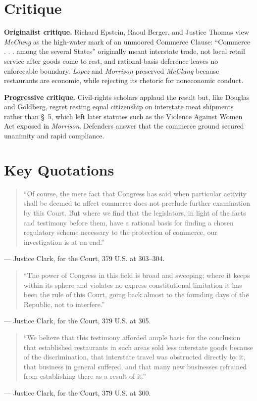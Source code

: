 \documentclass[12pt]{article}
\begin{document}
\section{Critique}

\textbf{Originalist critique.} Richard Epstein, Raoul Berger, and Justice Thomas view \textit{McClung} as the high-water mark of an unmoored Commerce Clause: ``Commerce . . . among the several States'' originally meant interstate trade, not local retail service after goods come to rest, and rational-basis deference leaves no enforceable boundary. \textit{Lopez} and \textit{Morrison} preserved \textit{McClung} because restaurants are economic, while rejecting its rhetoric for noneconomic conduct.

\textbf{Progressive critique.} Civil-rights scholars applaud the result but, like Douglas and Goldberg, regret resting equal citizenship on interstate meat shipments rather than \S~5, which left later statutes such as the Violence Against Women Act exposed in \textit{Morrison}. Defenders answer that the commerce ground secured unanimity and rapid compliance.

\section{Key Quotations}

\begin{quote}
``Of course, the mere fact that Congress has said when particular activity shall be deemed to affect commerce does not preclude further examination by this Court. But where we find that the legislators, in light of the facts and testimony before them, have a rational basis for finding a chosen regulatory scheme necessary to the protection of commerce, our investigation is at an end.''
\end{quote}
\noindent --- Justice Clark, for the Court, 379 U.S. at 303--304.

\begin{quote}
``The power of Congress in this field is broad and sweeping; where it keeps within its sphere and violates no express constitutional limitation it has been the rule of this Court, going back almost to the founding days of the Republic, not to interfere.''
\end{quote}
\noindent --- Justice Clark, for the Court, 379 U.S. at 305.

\begin{quote}
``We believe that this testimony afforded ample basis for the conclusion that established restaurants in such areas sold less interstate goods because of the discrimination, that interstate travel was obstructed directly by it, that business in general suffered, and that many new businesses refrained from establishing there as a result of it.''
\end{quote}
\noindent --- Justice Clark, for the Court, 379 U.S. at 300.
\end{document}
